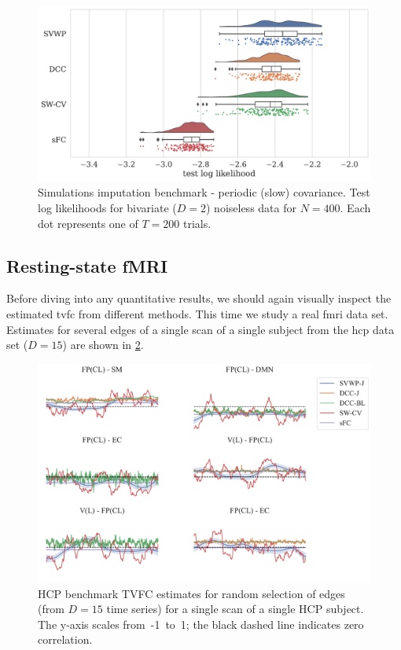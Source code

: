 \begin{figure}[t]
  \centering
  \includegraphics[width=\textwidth]{fig/sim/d2/N0400_T0200/imputation_study/LEOO_no_noise_test_log_likelihoods_raincloud_periodic_1}
  \caption{
    Simulations imputation benchmark - periodic (slow) covariance.
    Test log likelihoods for bivariate ($D = 2$) noiseless data for $N = 400$.
    Each dot represents one of $T = 200$ trials.
  }
  \label{fig:sim-imputation-study-d2-periodic-1}
\end{figure}


\clearpage
\subsection{Resting-state fMRI}
\label{subsec:hcp-results}

Before diving into any quantitative results, we should again visually inspect the estimated \gls{tvfc} from different methods.
This time we study a real \gls{fmri} data set.
Estimates for several edges of a single scan of a single subject from the \gls{hcp} data set ($D = 15$) are shown in \cref{fig:hcp-model-estimates-example}.


\begin{figure}[ht]
  \centering
  \includegraphics[width=\textwidth]{fig/hcp/d15/TVFC_predictions/scan_0/all/100206/correlation_estimates_random_edges}
  \caption{
    HCP benchmark TVFC estimates for random selection of edges (from $D = 15$ time series) for a single scan of a single HCP subject.
    The y-axis scales from~-1~to~1; the black dashed line indicates zero correlation.
  }
  \label{fig:hcp-model-estimates-example}
\end{figure}


